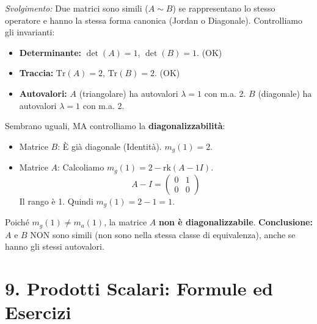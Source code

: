 \documentclass[10pt,a4paper]{article}
\begin{document}
\textit{Svolgimento:}
Due matrici sono simili ($A \sim B$) se rappresentano lo stesso operatore e hanno la stessa forma canonica (Jordan o Diagonale).
Controlliamo gli invarianti:
\begin{itemize}
    \item \textbf{Determinante:} $\det(A)=1$, $\det(B)=1$. (OK)
    \item \textbf{Traccia:} $\text{Tr}(A)=2$, $\text{Tr}(B)=2$. (OK)
    \item \textbf{Autovalori:}
    $A$ (triangolare) ha autovalori $\lambda=1$ con m.a. 2.
    $B$ (diagonale) ha autovalori $\lambda=1$ con m.a. 2.
\end{itemize}
Sembrano uguali, MA controlliamo la \textbf{diagonalizzabilità}:
\begin{itemize}
    \item Matrice $B$: È già diagonale (Identità). $m_g(1) = 2$.
    \item Matrice $A$: Calcoliamo $m_g(1) = 2 - \text{rk}(A-1I)$.
    \[ A - I = \begin{pmatrix} 0 & 1 \\ 0 & 0 \end{pmatrix} \]
    Il rango è 1. Quindi $m_g(1) = 2 - 1 = 1$.
\end{itemize}
Poiché $m_g(1) \neq m_a(1)$, la matrice $A$ \textbf{non è diagonalizzabile}.
\textbf{Conclusione:} $A$ e $B$ NON sono simili (non sono nella stessa classe di equivalenza), anche se hanno gli stessi autovalori.
\section*{9. Prodotti Scalari: Formule ed Esercizi}
\end{document}
